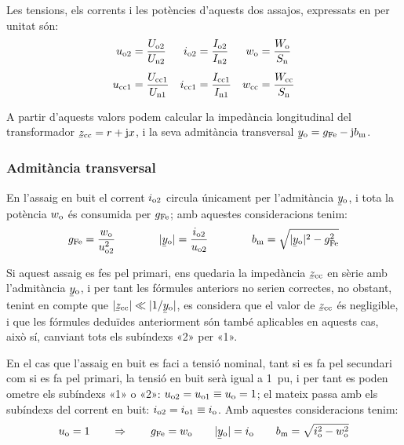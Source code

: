 Les tensions, els corrents i les potències d'aquests dos  assajos,
expressats en per unitat són:
\begin{align}
    u_\mathrm{o2} &=\frac{U_\mathrm{o2}}{U_\mathrm{n2}} &
    i_\mathrm{o2} &=\frac{I_\mathrm{o2}}{I_\mathrm{n2}} &
    w_\mathrm{o}  &=\frac{W_\mathrm{o}}{S_\mathrm{n}} \\[1ex]
    u_\mathrm{cc1} &=\frac{U_\mathrm{cc1}}{U_\mathrm{n1}} &
    i_\mathrm{cc1} &=\frac{I_\mathrm{cc1}}{I_\mathrm{n1}} &
    w_\mathrm{cc} &=\frac{W_\mathrm{cc}}{S_\mathrm{n}}
\end{align}

A partir d'aquests valors podem calcular la impedància longitudinal
del transformador $\cmplx{z}\ped{cc}=r+\ju x$, i la seva admitància
transversal $\cmplx{y}\ped{o}=g\ped{Fe}-\ju b\ped{m}$.

\subsubsection{Admitància transversal}

En l'assaig en buit el corrent $i_\mathrm{o2}$ circula
únicament per l'admitància $\cmplx{y}\ped{o}$, i tota la potència
$w_\mathrm{o}$ és consumida per $g_\mathrm{Fe}$; amb aquestes consideracions
tenim:
\begin{equation}
    g\ped{Fe} = \frac{w\ped{o}}{u\ped{o2}^2} \qquad\qquad
    |\cmplx{y}\ped{o}| = \frac{i\ped{o2}}{u\ped{o2}}
    \qquad\qquad
    b\ped{m} = \sqrt{|\cmplx{y}\ped{o}|^2 - g\ped{Fe}^2}
\end{equation}

Si aquest assaig es fes pel primari, ens quedaria la impedància
$\cmplx{z}\ped{cc}$ en sèrie amb l'admitància $\cmplx{y}\ped{o}$, i
per tant les fórmules anteriors no serien correctes, no obstant,
tenint en compte que $|\cmplx{z}\ped{cc}| \ll |1/\cmplx{y}\ped{o}|$,
es  considera que el valor de $\cmplx{z}\ped{cc}$ és negligible, i
que les fórmules deduïdes anteriorment són també aplicables en
aquests cas, això sí, canviant tots els subíndexs «2» per «1».

En el cas que l'assaig en buit es faci a tensió nominal, tant  si es
fa pel secundari com si es fa pel primari, la tensió en buit serà
igual a \SI{1}{pu}, i per tant es poden ometre els subíndexs «1» o «2»:
$u_\mathrm{o2} = u_\mathrm{o1} \equiv u_\mathrm{o} = 1$; el mateix passa amb els
subíndexs del corrent en buit: $i_\mathrm{o2} = i_\mathrm{o1} \equiv
i_\mathrm{o}$. Amb aquestes consideracions tenim:
\begin{equation}
    u\ped{o} = 1 \qquad \Rightarrow \qquad g\ped{Fe} = w\ped{o} \qquad
    |\cmplx{y}\ped{o}| = i\ped{o} \qquad
    b\ped{m} = \sqrt{i\ped{o}^2 - w\ped{o}^2}
    \label{eq:assaig-buit-nomianl}
\end{equation}

